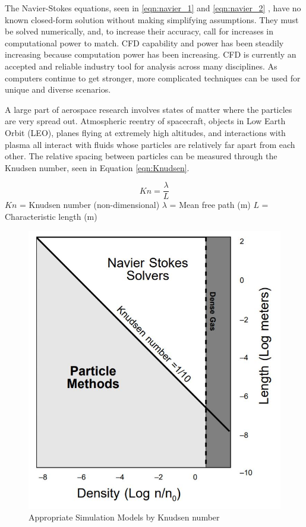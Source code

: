 \indent The Navier-Stokes equations, seen in  \ref{eqn:navier_1} and \ref{eqn:navier_2} \cite{navier_eqns}, have no known closed-form solution without making simplifying assumptions. They must be solved numerically, and, to increase their accuracy, call for increases in computational power to match. CFD capability and power has been steadily increasing because computation power has been increasing. CFD is currently an accepted and reliable industry tool for analysis across many disciplines. As computers continue to get stronger, more complicated techniques can be used for unique and diverse scenarios. \par

\indent A large part of aerospace research involves states of matter where the particles are very spread out. Atmospheric reentry of spacecraft, objects in Low Earth Orbit (LEO), planes flying at extremely high altitudes, and interactions with plasma all interact with fluids whose particles are relatively far apart from each other. The relative spacing between particles can be measured through the Knudsen number, seen in Equation \ref{eqn:Knudsen}. \par

\begin{equation}
    \label{eqn:Knudsen}
    Kn = \frac{\lambda}{L}
\end{equation}
\(Kn\) = Knudsen number (non-dimensional) \newline
\(\lambda\) = Mean free path (m) \newline
\(L\) = Characteristic length (m) \par


\begin{figure}
    \includegraphics[width=.55\textwidth]{figures/navier.JPG}
    \centering
    \caption[Appropriate Simulation Models by Knudsen number]{Appropriate Simulation Models by Knudsen number \newline \cite{navier} }
    \label{fig:navier}
\end{figure}


